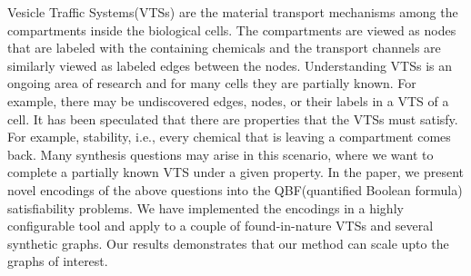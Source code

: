 Vesicle Traffic Systems(VTSs) are the material transport 
mechanisms among the compartments inside the biological cells.
%
The compartments are viewed as nodes that are labeled with the
containing chemicals and the transport channels
are similarly viewed as labeled edges between the nodes.
%
Understanding VTSs is an ongoing area of research and for many cells
they are partially known.
%
For example, there may be undiscovered edges, nodes, or their labels
in a VTS of a cell.
%
It has been speculated that there are properties that the VTSs must
satisfy.
%
For example, stability, i.e., every chemical that is leaving a
compartment comes back.
%
Many synthesis questions may arise in this scenario, where we want
to complete a partially known VTS under a given property.
%
In the paper, we present novel encodings of the above questions
into the QBF(quantified Boolean formula) satisfiability problems.
%
We have implemented the encodings in a highly configurable tool
and apply to a couple of found-in-nature VTSs and 
several synthetic graphs.
%
Our results demonstrates that our method can scale upto the
graphs of interest.
%

